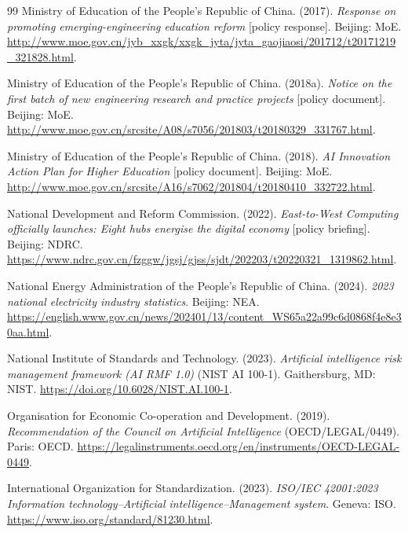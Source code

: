 \documentclass[12pt]{article}
\begin{document}
\begin{thebibliography}{99}
Ministry of Education of the People's Republic of China. (2017). \textit{Response on promoting emerging-engineering education reform} [policy response]. Beijing: MoE. \url{http://www.moe.gov.cn/jyb_xxgk/xxgk_jyta/jyta_gaojiaosi/201712/t20171219_321828.html}.

Ministry of Education of the People's Republic of China. (2018a). \textit{Notice on the first batch of new engineering research and practice projects} [policy document]. Beijing: MoE. \url{http://www.moe.gov.cn/srcsite/A08/s7056/201803/t20180329_331767.html}.

Ministry of Education of the People's Republic of China. (2018). \textit{AI Innovation Action Plan for Higher Education} [policy document]. Beijing: MoE. \url{http://www.moe.gov.cn/srcsite/A16/s7062/201804/t20180410_332722.html}.

National Development and Reform Commission. (2022). \textit{East-to-West Computing officially launches: Eight hubs energise the digital economy} [policy briefing]. Beijing: NDRC. \url{https://www.ndrc.gov.cn/fzggw/jgsj/gjss/sjdt/202203/t20220321_1319862.html}.

National Energy Administration of the People's Republic of China. (2024). \textit{2023 national electricity industry statistics}. Beijing: NEA. \url{https://english.www.gov.cn/news/202401/13/content_WS65a22a99c6d0868f4e8e30aa.html}.

National Institute of Standards and Technology. (2023). \textit{Artificial intelligence risk management framework (AI RMF 1.0)} (NIST AI 100-1). Gaithersburg, MD: NIST. \url{https://doi.org/10.6028/NIST.AI.100-1}.

Organisation for Economic Co-operation and Development. (2019). \textit{Recommendation of the Council on Artificial Intelligence} (OECD/LEGAL/0449). Paris: OECD. \url{https://legalinstruments.oecd.org/en/instruments/OECD-LEGAL-0449}.

International Organization for Standardization. (2023). \textit{ISO/IEC 42001:2023 Information technology--Artificial intelligence--Management system}. Geneva: ISO. \url{https://www.iso.org/standard/81230.html}.


\end{thebibliography}
\end{document}
